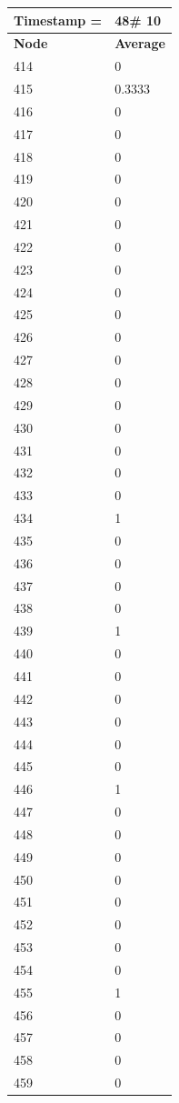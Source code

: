 \begin{tabular}{|l||l|}
\hline
\textbf{Timestamp =} & \textbf{48}\# 10\\\hline
	\textbf{Node} & \textbf{Average} \\ \hline
\hline
	414 & 0 \\ \hline
	415 & 0.3333 \\ \hline
	416 & 0 \\ \hline
	417 & 0 \\ \hline
	418 & 0 \\ \hline
	419 & 0 \\ \hline
	420 & 0 \\ \hline
	421 & 0 \\ \hline
	422 & 0 \\ \hline
	423 & 0 \\ \hline
	424 & 0 \\ \hline
	425 & 0 \\ \hline
	426 & 0 \\ \hline
	427 & 0 \\ \hline
	428 & 0 \\ \hline
	429 & 0 \\ \hline
	430 & 0 \\ \hline
	431 & 0 \\ \hline
	432 & 0 \\ \hline
	433 & 0 \\ \hline
	434 & 1 \\ \hline
	435 & 0 \\ \hline
	436 & 0 \\ \hline
	437 & 0 \\ \hline
	438 & 0 \\ \hline
	439 & 1 \\ \hline
	440 & 0 \\ \hline
	441 & 0 \\ \hline
	442 & 0 \\ \hline
	443 & 0 \\ \hline
	444 & 0 \\ \hline
	445 & 0 \\ \hline
	446 & 1 \\ \hline
	447 & 0 \\ \hline
	448 & 0 \\ \hline
	449 & 0 \\ \hline
	450 & 0 \\ \hline
	451 & 0 \\ \hline
	452 & 0 \\ \hline
	453 & 0 \\ \hline
	454 & 0 \\ \hline
	455 & 1 \\ \hline
	456 & 0 \\ \hline
	457 & 0 \\ \hline
	458 & 0 \\ \hline
	459 & 0 \\ \hline
\end{tabular}
